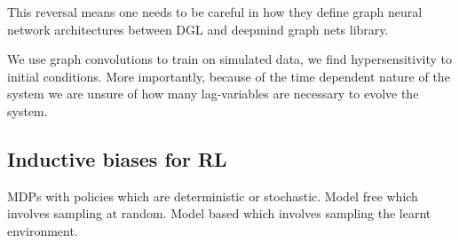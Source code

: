 \documentclass{article}
\begin{document}
This reversal means one needs to be careful in how they define graph neural network architectures between DGL and deepmind graph nets library.

We use graph convolutions to train on simulated data, we find hypersensitivity to initial conditions. More importantly, because of the time dependent nature of the system we are unsure of how many lag-variables are necessary to evolve the system.

\subsection{Inductive  biases for RL}

MDPs with policies which are deterministic or stochastic. Model free which involves sampling at random. Model based which involves sampling the learnt environment.
\end{document}
